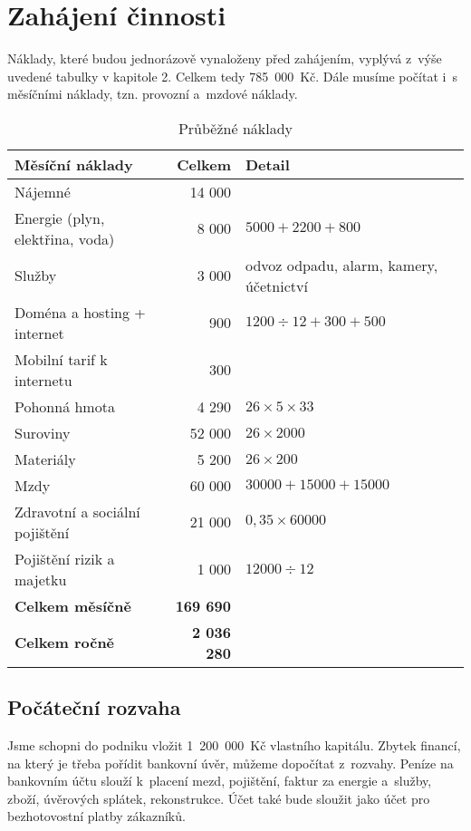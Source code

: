 \section{Zahájení činnosti}
Náklady, které budou jednorázově vynaloženy před zahájením, vyplývá z~výše uvedené tabulky v kapitole 2. Celkem tedy 785~000~Kč. Dále musíme počítat i~s~ měsíčními náklady, tzn. provozní a~mzdové náklady.


\begin{table}[htbp]
\begin{center}
\begin{tabular}{ l r l }

\textbf{Měsíční náklady} & \textbf{Celkem} & \textbf{Detail} \\ \hline 
Nájemné & 14 000 & \\ 
Energie (plyn, elektřina, voda) & 8 000 & $5000 + 2200 + 800$ \\ 
Služby & 3 000 & odvoz odpadu, alarm, kamery, účetnictví\\ 
Doména a hosting + internet & 900 & $1200 \div 12 + 300 + 500$ \\ 
Mobilní tarif k internetu & 300 & \\ 
Pohonná hmota & 4 290 & $26 \times 5 \times 33$ \\ 
Suroviny & 52 000 & $26 \times 2 000$ \\ 
Materiály & 5 200 & $26 \times 200$ \\ 
Mzdy & 60 000 & $30000 + 15000 + 15000$ \\ 
Zdravotní a sociální pojištění & 21 000 & $0,35 \times 60 000$ \\ 
Pojištění rizik a majetku & 1 000 & $12 000 \div 12$\\ \hline 
\textbf{Celkem měsíčně} & \textbf{169 690} & \\ 
\textbf{Celkem ročně} & \textbf{2 036 280} & \\

\end{tabular}
\caption{Průběžné náklady}
\label{prubezne_naklady}
\end{center}
\end{table}

\subsection{Počáteční rozvaha}
Jsme schopni do podniku vložit 1~200~000~Kč vlastního kapitálu. Zbytek financí, na který je třeba pořídit bankovní úvěr, můžeme dopočítat z~rozvahy. Peníze na bankovním účtu slouží k~placení mezd, pojištění, faktur za energie a~služby, zboží, úvěrových splátek, rekonstrukce. Účet také bude sloužit jako účet pro bezhotovostní platby zákazníků.

